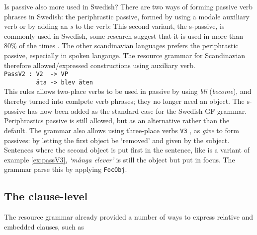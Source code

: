 \documentclass{report}
\begin{document}
Is passive also more used in Swedish?
There are two ways of forming passive verb phrases in Swedish: the 
periphrastic passive, formed by using a modale auxiliary verb 
or by adding an \emph{s} to
the verb:
This second variant, the s-passive, is commonly used in Swedish, some research
suggest that it is used in more than 80\% of the times \cite{laanemets}.
The other scandinavian languages prefers the periphrastic passive, especially in spoken langauge.
The resource grammar for Scandinavian therefore allowed/expressed constructions using auxiliary verb. \\
\verb|PassV2 : V2  -> VP | \\
\verb|         äta -> blev äten| \\
This rules allows two-place verbs to be used in passive by using \emph{bli} (\emph{become}), and thereby
turned into comlpete verb phrases; they no longer need an object.
The s-passive has now been added as the standard case for the Swedish GF
grammar. Periphrastics passive is still allowed, but as an alternative rather
than the default.
The grammar also allows using three-place verbs \verb|V3| , as \emph{give} to
form passives:
\label{ex:passV3}
by letting the first object be `removed' and given by the subject. 
Sentences where the second object is put first in the sentence, like 
is a variant of example \ref{ex:passV3}, \emph{`många elever'} is still the object but put in focus. The grammar
parse this by applying \verb|FocObj|.

\subsection{The clause-level}
The resource grammar already provided a number of ways to express relative and embedded clauses, such as
\end{document}
